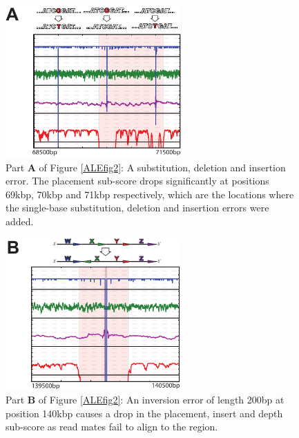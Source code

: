 \documentclass[phd,tocprelim]{cornell}
\begin{document}
\begin{figure}[hptb]%
    \centerline{\includegraphics[width=0.6\textwidth]{figures/ALE/fig2_bot_p1.pdf}}
    \caption[ALE performance: synthetic single base errors]{Part {\bf A} of Figure \ref{ALEfig2}: A substitution, deletion and insertion error. The placement sub-score drops significantly at positions 69kbp, 70kbp and 71kbp respectively, which are the locations where the single-base substitution, deletion and insertion errors were added.}\label{ALEfig2p1}
\end{figure}

\begin{figure}[hptb]%
    \centerline{\includegraphics[width=0.6\textwidth]{figures/ALE/fig2_bot_p2.pdf}}
    \caption[ALE performance: synthetic inversion]{Part {\bf B} of Figure \ref{ALEfig2}: An inversion error of length 200bp at position 140kbp causes a drop in the placement, insert and depth sub-score as read mates fail to align to the region.}\label{ALEfig2p2}
\end{figure}
\end{document}
